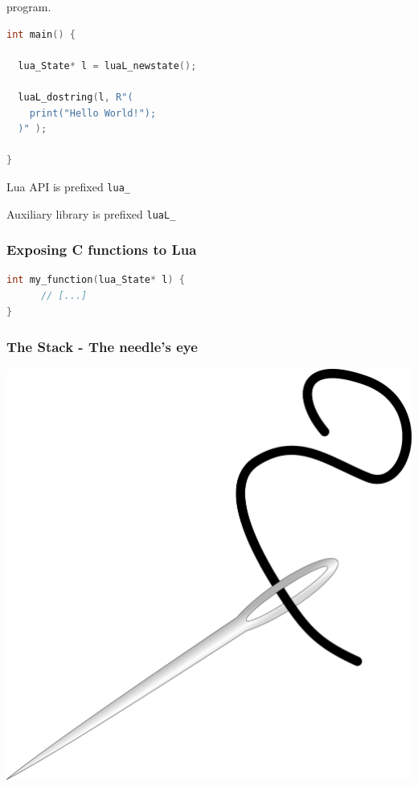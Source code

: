 \documentclass{beamer}
\begin{document}
\begin{frame}[fragile]
program.

  \begin{lstlisting}[language={C++}]
int main() {

  lua_State* l = luaL_newstate();

  luaL_dostring(l, R"(
    print("Hello World!");
  )" );
  
}
  \end{lstlisting}

  Lua API is prefixed \texttt{lua\_}
  
  Auxiliary library is prefixed \texttt{luaL\_}
  
\end{frame}


\begin{frame}[fragile]
  \frametitle{Exposing C functions to Lua}

  \begin{lstlisting}[language={C++}]
int my_function(lua_State* l) {
      // [...]
}
  \end{lstlisting}
  
\end{frame}

\begin{frame}

  \frametitle{The Stack - The needle's eye}

  \begin{center}
    \includegraphics[height=.9\textheight]{resources/needle.png}
  \end{center}

\end{frame}
\end{document}
